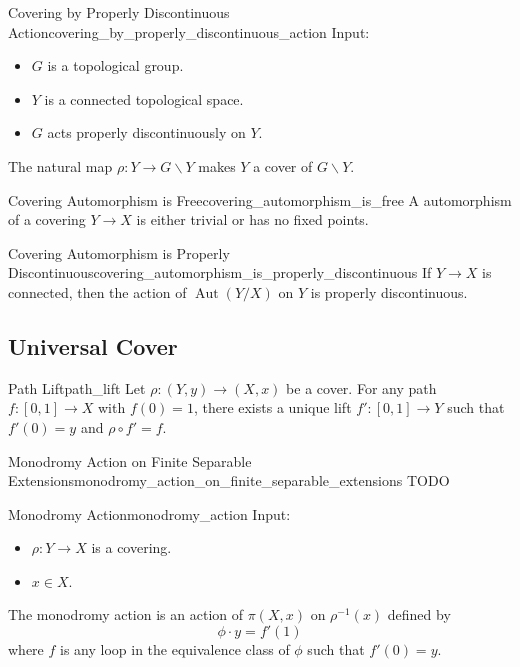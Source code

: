 \documentclass{article}
\begin{document}
\begin{theorem}{Covering by Properly Discontinuous Action}{covering_by_properly_discontinuous_action}
    Input:
    \begin{itemize}
        \item $G$ is a topological group.
        \item $Y$ is a connected topological space.
        \item $G$ acts properly discontinuously on $Y$.
    \end{itemize}
    The natural map $\rho:Y\rightarrow G\backslash Y$ makes $Y$ a cover of $G\backslash Y$.
\end{theorem}

\begin{theorem}{Covering Automorphism is Free}{covering_automorphism_is_free}
    A automorphism of a covering $Y\rightarrow X$ is either trivial or has no fixed points.
\end{theorem}

\begin{theorem}{Covering Automorphism is Properly Discontinuous}{covering_automorphism_is_properly_discontinuous}
    If $Y\rightarrow X$ is connected, then the action of $\operatorname{Aut}(Y/X)$ on $Y$ is properly discontinuous.
\end{theorem}

\subsection{Universal Cover}

\begin{theorem}{Path Lift}{path_lift}
    Let $\rho:(Y,y) \rightarrow (X,x)$ be a cover.
    For any path $f:[0,1]\rightarrow X$ with $f(0) = 1$, there exists a unique lift $f':[0,1]\rightarrow Y$ such that $f'(0) = y$ and $\rho\circ f' = f$.
\end{theorem}

\begin{theorem}{Monodromy Action on Finite Separable Extensions}{monodromy_action_on_finite_separable_extensions}
    {\color{red}TODO}
\end{theorem}

\begin{definition}{Monodromy Action}{monodromy_action}
    Input:
    \begin{itemize}
        \item $\rho:Y\rightarrow X$ is a covering.
        \item $x\in X$.
    \end{itemize}
    The monodromy action is an action of $\pi(X,x)$ on $\rho^{-1}(x)$ defined by
    \[ \phi \cdot y = f'(1) \]
    where $f$ is any loop in the equivalence class of $\phi$ such that $f'(0) = y$.
\end{definition}
\end{document}
